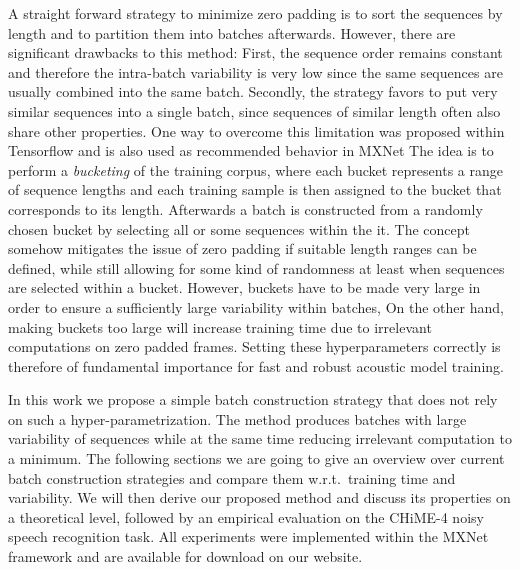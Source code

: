 \documentclass{article}
\begin{document}
    A straight forward strategy to minimize zero padding is to sort the sequences by length and to partition them into
    batches afterwards. However, there are significant drawbacks to this method: First, the sequence order remains constant
    and therefore the intra-batch variability is very low since the same sequences are usually combined into the same batch. Secondly, the strategy favors to put very similar sequences into a single batch, since sequences of similar length often also share other properties.
    One way to overcome this limitation was proposed within Tensorflow and is also used as recommended 
    behavior in MXNet The idea is to perform a \textit{bucketing} of the training corpus, where each bucket represents
    a range of sequence lengths and each training sample is then assigned to the bucket that corresponds to its length.
    Afterwards a batch is constructed from a randomly chosen bucket by selecting all or some sequences within the it.
    The concept somehow mitigates the issue of zero padding if suitable length ranges can be defined, while still allowing for 
    some kind of randomness at least when sequences are selected within a bucket. However, buckets have to be made very large 
    in order to ensure a sufficiently large variability within batches, On the other hand, making buckets too large will 
    increase training time due to irrelevant computations on zero padded frames. Setting these hyperparameters correctly is
    therefore of fundamental importance for fast and robust acoustic model training.
    
    In this work we propose a simple batch construction strategy that does not rely on such a hyper-parametrization. The method 
    produces batches with large variability of sequences while at the same time reducing irrelevant computation to a minimum.
    The following sections we are going to give an overview over current batch construction strategies and compare them 
    w.r.t.~training time and variability. We will then derive our proposed method and discuss its properties on a theoretical
    level, followed by an empirical evaluation on the CHiME-4 noisy speech recognition task. All experiments were implemented 
    within the MXNet framework and are available for download on our website.
   
\end{document}
